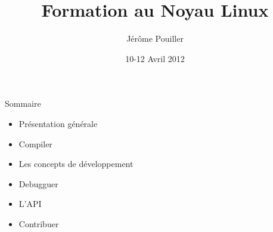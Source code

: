 \documentclass[10pt,ucs,usepdftitle=false]{beamer}
\title{Formation au Noyau Linux}
\author[J. Pouiller]{Jérôme Pouiller \email{j.pouiller@sysmic.org}}
\institute[Sysmic]{\hspace*{1cm}\pgfimage[height=1.5cm]{pics/logo}}
\date[Avr. 2012]{10-12 Avril 2012}
\begin{document}
 
  \begin{frame}[plain]
    \maketitle
  \end{frame}

  \begin{frame}{Sommaire}
    \begin{itemize} 
      \item Présentation générale
      \item Compiler
      \item Les concepts de développement
      \item Debugguer
      \item L'API
      \item Contribuer
    \end{itemize} 
  \end{frame}
  
  
  
  
  
  
%  
\end{document}
